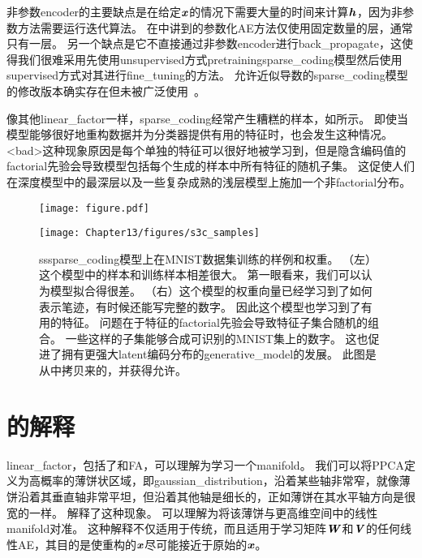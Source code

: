 非参数\gls{encoder}的主要缺点是在给定$\boldsymbol{\mathit{x}}$的情况下需要大量的时间来计算$\boldsymbol{\mathit{h}}$，因为非参数方法需要运行迭代算法。
在中讲到的参数化\gls{AE}方法仅使用固定数量的层，通常只有一层。
另一个缺点是它不直接通过非参数\gls{encoder}进行\gls{back_propagate}，这使得我们很难采用先使用\gls{unsupervised}方式\gls{pretraining}\gls{sparse_coding}模型然后使用\gls{supervised}方式对其进行\gls{fine_tuning}的方法。
允许近似导数的\gls{sparse_coding}模型的修改版本确实存在但未被广泛使用~\citep{Bradley+Bagnell-2009-small}。

像其他\gls{linear_factor}一样，\gls{sparse_coding}经常产生糟糕的样本，如所示。
即使当模型能够很好地重构数据并为分类器提供有用的特征时，也会发生这种情况。
<bad>这种现象原因是每个单独的特征可以很好地被学习到，但是隐含编码值的\gls{factorial}先验会导致模型包括每个生成的样本中所有特征的随机子集。
这促使人们在深度模型中的最深层以及一些复杂成熟的浅层模型上施加一个非\gls{factorial}分布。

\begin{figure}[!htb]
\ifOpenSource
\centerline{\texttt{[image: figure.pdf]}}
\else
    \centerline{\texttt{[image: Chapter13/figures/s3c\_samples]}}
\fi
\caption{\gls{ss}\gls{sparse_coding}模型上在MNIST数据集训练的样例和权重。
（左）这个模型中的样本和训练样本相差很大。
第一眼看来，我们可以认为模型拟合得很差。
（右）这个模型的权重向量已经学习到了如何表示笔迹，有时候还能写完整的数字。
因此这个模型也学习到了有用的特征。
问题在于特征的\gls{factorial}先验会导致特征子集合随机的组合。
一些这样的子集能够合成可识别的MNIST集上的数字。
这也促进了拥有更强大\gls{latent}编码分布的\gls{generative_model}的发展。
此图是从\citet{Goodfeli-et-al-TPAMI-Deep-PrePrint-2013-small}中拷贝来的，并获得允许。}
\label{fig:s3c_samples}
\end{figure}



\section{的解释}
\label{sec:manifold_interpretation_of_pca}


\gls{linear_factor}，包括了和\gls{FA}，可以理解为学习一个\gls{manifold}\citep{hinton97modelling}。
我们可以将\gls{PPCA}定义为高概率的薄饼状区域，即\gls{gaussian_distribution}，沿着某些轴非常窄，就像薄饼沿着其垂直轴非常平坦，但沿着其他轴是细长的，正如薄饼在其水平轴方向是很宽的一样。
解释了这种现象。
可以理解为将该薄饼与更高维空间中的线性\gls{manifold}对准。
这种解释不仅适用于传统，而且适用于学习矩阵$\boldsymbol{\mathit{W}}$和$\boldsymbol{\mathit{V}}$的任何线性\gls{AE}，其目的是使重构的$\boldsymbol{\mathit{x}}$尽可能接近于原始的$\boldsymbol{\mathit{x}}$。

